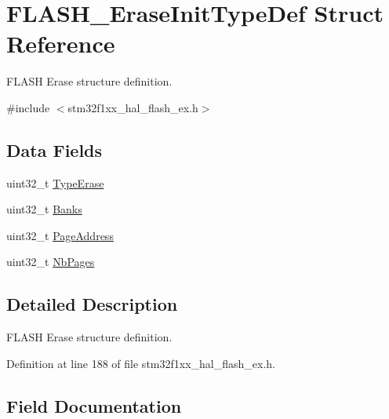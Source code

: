 \hypertarget{struct_f_l_a_s_h___erase_init_type_def}{}\section{F\+L\+A\+S\+H\+\_\+\+Erase\+Init\+Type\+Def Struct Reference}
\label{struct_f_l_a_s_h___erase_init_type_def}


F\+L\+A\+SH Erase structure definition.  




{\ttfamily \#include $<$stm32f1xx\+\_\+hal\+\_\+flash\+\_\+ex.\+h$>$}

\subsection*{Data Fields}
\begin{DoxyCompactItemize}
\item 
uint32\+\_\+t \hyperlink{struct_f_l_a_s_h___erase_init_type_def_ae2154c09320f3ef7feb8f4a84e9ac17b}{Type\+Erase}
\item 
uint32\+\_\+t \hyperlink{struct_f_l_a_s_h___erase_init_type_def_aa07868a5b012861c6111322c3dccdbec}{Banks}
\item 
uint32\+\_\+t \hyperlink{struct_f_l_a_s_h___erase_init_type_def_ac0d6c69c326b962d7748bf477c235b00}{Page\+Address}
\item 
uint32\+\_\+t \hyperlink{struct_f_l_a_s_h___erase_init_type_def_a883b193a78c63e993f1d70102eac64b3}{Nb\+Pages}
\end{DoxyCompactItemize}


\subsection{Detailed Description}
F\+L\+A\+SH Erase structure definition. 

Definition at line 188 of file stm32f1xx\+\_\+hal\+\_\+flash\+\_\+ex.\+h.



\subsection{Field Documentation}
\mbox{\label{struct_f_l_a_s_h___erase_init_type_def_aa07868a5b012861c6111322c3dccdbec}} 
